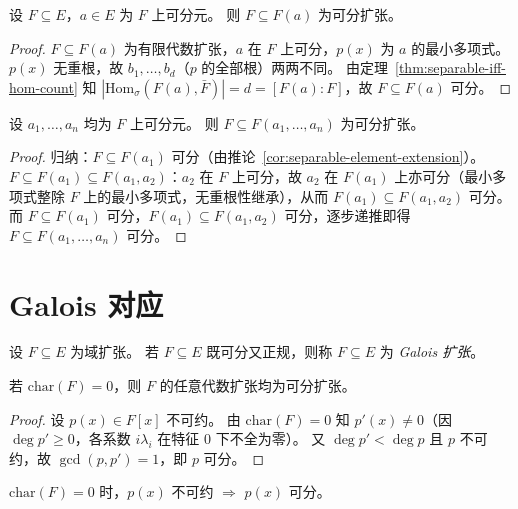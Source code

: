 \documentclass[lang=cn,a4paper,newtx]{elegantbook}
\begin{document}
\begin{corollary}\label{separable-element-extension}
  设 $F\subseteq E$，$a\in E$ 为 $F$ 上可分元。
  则 $F\subseteq F(a)$ 为可分扩张。
\end{corollary}

\begin{proof}
  $F\subseteq F(a)$ 为有限代数扩张，$a$ 在 $F$ 上可分，$p(x)$ 为 $a$ 的最小多项式。
  $p(x)$ 无重根，故 $b_1,\dots,b_d$（$p$ 的全部根）两两不同。
  由定理~\ref{thm:separable-iff-hom-count} 知 $|\mathrm{Hom}_{\sigma}(F(a),\bar F)|=d=[F(a):F]$，故 $F\subseteq F(a)$ 可分。
\end{proof}

\begin{corollary}\label{separable-elements-extension}
  设 $a_1,\dots,a_n$ 均为 $F$ 上可分元。
  则 $F\subseteq F(a_1,\dots,a_n)$ 为可分扩张。
\end{corollary}

\begin{proof}
  归纳：$F\subseteq F(a_1)$ 可分（由推论~\ref{cor:separable-element-extension}）。
  $F\subseteq F(a_1)\subseteq F(a_1,a_2)$：$a_2$ 在 $F$ 上可分，故 $a_2$ 在 $F(a_1)$ 上亦可分（最小多项式整除 $F$ 上的最小多项式，无重根性继承），从而 $F(a_1)\subseteq F(a_1,a_2)$ 可分。
  而 $F\subseteq F(a_1)$ 可分，$F(a_1)\subseteq F(a_1,a_2)$ 可分，逐步递推即得 $F\subseteq F(a_1,\dots,a_n)$ 可分。
\end{proof}

\section{Galois 对应}

\begin{definition}[Galois 扩张]
  设 $F\subseteq E$ 为域扩张。
  若 $F\subseteq E$ 既可分又正规，则称 $F\subseteq E$ 为 \emph{Galois 扩张}。
\end{definition}

\begin{proposition}
  若 $\mathrm{char}(F)=0$，则 $F$ 的任意代数扩张均为可分扩张。
\end{proposition}

\begin{proof}
  设 $p(x)\in F[x]$ 不可约。
  由 $\mathrm{char}(F)=0$ 知 $p'(x)\ne 0$（因 $\deg p'\ge 0$，各系数 $i\lambda_i$ 在特征 $0$ 下不全为零）。
  又 $\deg p'<\deg p$ 且 $p$ 不可约，故 $\gcd(p,p')=1$，即 $p$ 可分。
\end{proof}

\begin{remark}
  $\mathrm{char}(F)=0$ 时，$p(x)$ 不可约 $\Rightarrow$ $p(x)$ 可分。
\end{remark}
\end{document}
